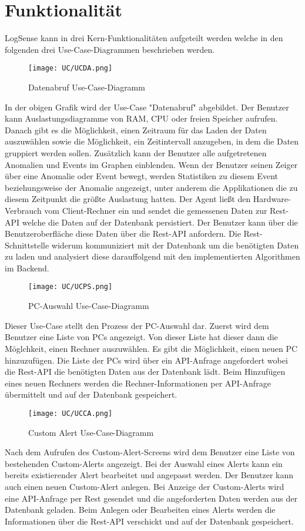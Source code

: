 \documentclass{report}
\begin{document}
\section{Funktionalität}
LogSense kann in drei Kern-Funktionalitäten aufgeteilt werden welche in den folgenden drei Use-Case-Diagrammen beschrieben werden.
\begin{figure}[H]
    \centering
    \texttt{[image: UC/UCDA.png]}
    \caption{Datenabruf Use-Case-Diagramm}
\end{figure}
In der obigen Grafik wird der Use-Case "Datenabruf" abgebildet. Der Benutzer kann Auslastungsdiagramme von RAM, CPU oder freien Speicher aufrufen. Danach gibt es die Möglichkeit, einen Zeitraum für das Laden der Daten auszuwählen sowie die Möglichkeit, ein Zeitintervall anzugeben, in dem die Daten gruppiert werden sollen. Zusätzlich kann der Benutzer alle aufgetretenen Anomalien und Events im Graphen einblenden. Wenn der Benutzer seinen Zeiger über eine Anomalie oder Event bewegt, werden Statistiken zu diesem Event beziehungsweise der Anomalie angezeigt, unter anderem die Applikationen die zu diesem Zeitpunkt die größte Auslastung hatten. Der Agent ließt den Hardware-Verbrauch vom Client-Rechner ein und sendet die gemessenen Daten zur Rest-API welche die Daten auf der Datenbank persistiert. Der Benutzer kann über die Benutzeroberfläche diese Daten über die Rest-API anfordern. Die Rest-Schnittstelle widerum kommuniziert mit der Datenbank um die benötigten Daten zu laden und analysiert diese darauffolgend mit den implementierten Algorithmen im Backend. 
\begin{figure}[H]
    \centering
    \texttt{[image: UC/UCPS.png]}
    \caption{PC-Auswahl Use-Case-Diagramm}
\end{figure}
Dieser Use-Case stellt den Prozess der PC-Auswahl dar. Zuerst wird dem Benutzer eine Liste von PCs angezeigt. Von dieser Liste hat dieser dann die Möglchkeit, einen Rechner auszuwählen. Es gibt die Möglichkeit, einen neuen PC hinzuzufügen. Die Liste der PCs wird über ein API-Anfrage angefordert wobei die Rest-API die benötigten Daten aus der Datenbank lädt. Beim Hinzufügen eines neuen Rechners werden die Rechner-Informationen per API-Anfrage übermittelt und auf der Datenbank gespeichert.
\begin{figure}[H]
    \centering
    \texttt{[image: UC/UCCA.png]}
    \caption{Custom Alert Use-Case-Diagramm}
\end{figure}
Nach dem Aufrufen des Custom-Alert-Screens wird dem Benutzer eine Liste von bestehenden Custom-Alerts angezeigt. Bei der Auswahl eines Alerts kann ein bereits existierender Alert bearbeitet und angepasst werden. Der Benutzer kann auch einen neuen Custom-Alert anlegen. Bei Anzeige der Custom-Alerts wird eine API-Anfrage per Rest gesendet und die angeforderten Daten werden aus der Datenbank geladen. Beim Anlegen oder Bearbeiten eines Alerts werden die Informationen über die Rest-API verschickt und auf der Datenbank gespeichert. 
\end{document}
